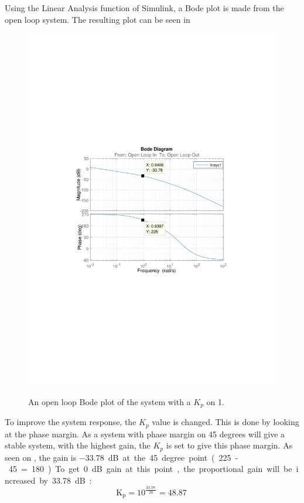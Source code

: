 Using the Linear Analysis function of Simulink, a Bode plot is made from the open loop system. The resulting plot can be seen in 
\begin{figure}[H]
  \centering
  {
    \includegraphics[width=1.4\textwidth]{figures/distanceBode1.pdf}
  }
  \caption{An open loop Bode plot of the system with a $K_p$ on 1.}
  \label{SimulationSteeringB1}
\end{figure}

To improve the system response, the $K_p$ value is changed. This is done by looking at the phase margin. As a system with phase margin on 45 degrees will give a stable system, with the highest gain, the $K_p$ is set to give this phase margin. As seen on , the gain is \SI{-33,78}dB at the 45 degree point (225-45=180). To get 0 dB gain at this point, the proportional gain will be increased by  \SI{33,78}dB:
$$\text{K}_\text{p}=10^{\frac{\SI{33,78}{}}{20}} = \SI{48,87}{}$$

